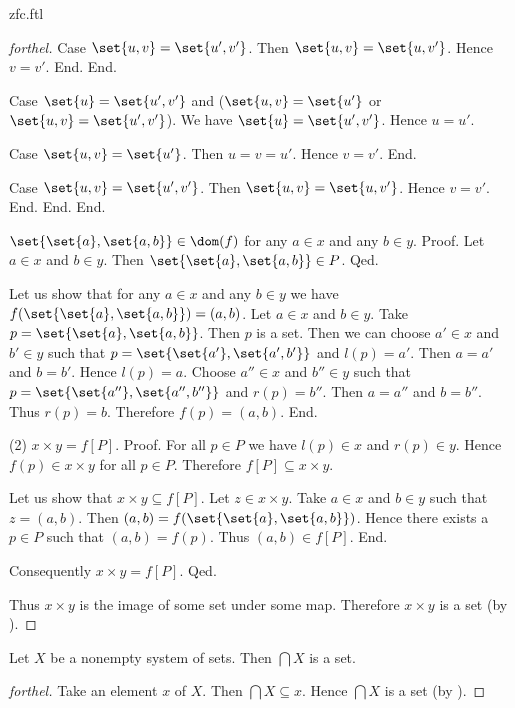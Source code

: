 \documentclass{naproche-library}
\begin{document}
\begin{smodule}[title=ZFC]{zfc.ftl}
\begin{proof}[forthel]
      Case $\set{u,v} = \set{u',v'}$.
        Then $\set{u,v} = \set{u,v'}$.
        Hence $v = v'$.
      End.
    End.

    Case $\set{u} = \set{u',v'}$ and ($\set{u,v} = \set{u'}$ or $\set{u,v} = \set{u',v'}$).
      We have $\set{u} = \set{u',v'}$.
      Hence $u = u'$.

      Case $\set{u,v} = \set{u'}$.
        Then $u = v = u'$.
        Hence $v = v'$.
      End.

      Case $\set{u,v} = \set{u',v'}$.
        Then $\set{u,v} = \set{u,v'}$.
        Hence $v = v'$.
      End.
    End.
  End.

  $\set{\set{a}, \set{a,b}} \in \dom(f)$ for any $a \in x$ and any $b \in y$. \newline %
  Proof.
    Let $a \in x$ and $b \in y$.
    Then $\set{\set{a}, \set{a,b}} \in P$.
  Qed.

  Let us show that for any $a \in x$ and any $b \in y$ we have $f(\set{\set{a}, \set{a,b}}) = (a,b)$.
    Let $a \in x$ and $b \in y$.
    Take $p = \set{\set{a}, \set{a,b}}$.
    Then $p$ is a set.
    Then we can choose $a' \in x$ and $b' \in y$ such that $p = \set{\set{a'}, \set{a',b'}}$ and $l(p) = a'$.
    Then $a = a'$ and $b = b'$.
    Hence $l(p) = a$.
    Choose $a'' \in x$ and $b'' \in y$ such that $p = \set{\set{a''}, \set{a'',b''}}$ and $r(p) = b''$.
    Then $a = a''$ and $b = b''$.
    Thus $r(p) = b$.
    Therefore $f(p) = (a,b)$.
  End.

  (2) $x \times y = f[P]$. \newline
  Proof.
    For all $p \in P$ we have $l(p) \in x$ and $r(p) \in y$.
    Hence $f(p) \in x \times y$ for all $p \in P$.
    Therefore $f[P] \subseteq x \times y$.

    Let us show that $x \times y \subseteq f[P]$.
      Let $z \in x \times y$.
      Take $a \in x$ and $b \in y$ such that $z = (a,b)$.
      Then $(a,b) = f(\set{\set{a}, \set{a,b}})$.
      Hence there exists a $p \in P$ such that $(a,b) = f(p)$.
      Thus $(a,b) \in f[P]$.
    End.

    Consequently $x \times y = f[P]$.
  Qed.

  Thus $x \times y$ is the image of some set under some map.
  Therefore $x \times y$ is a set (by ).
\end{proof}

\begin{proposition}[forthel,id=FOUNDATIONS_10_5486815207227392]
  Let $X$ be a nonempty system of sets.
  Then $\bigcap X$ is a set.
\end{proposition}
\begin{proof}[forthel]
  Take an element $x$ of $X$.
  Then $\bigcap X \subseteq x$.
  Hence $\bigcap X$ is a set (by ).
\end{proof}


\end{smodule}
\end{document}
